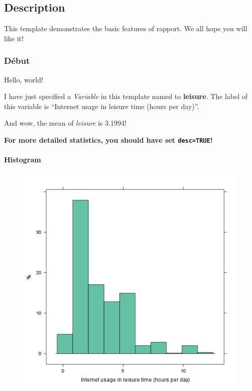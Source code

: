 \documentclass{article}
\makeatletter
\def\maxwidth{\ifdim\Gin@nat@width>\linewidth\linewidth
\else\Gin@nat@width\fi}
\let\Oldincludegraphics\includegraphics
\renewcommand{\includegraphics}[1]{\Oldincludegraphics[width=\maxwidth]{#1}}
\makeatother
\begin{document}
\subsection{Description}

This template demonstrates the basic features of rapport. We all hope
you will like it!

\subsubsection{Début}

Hello, world!

I have just specified a \emph{Variable} in this template named to
\textbf{leisure}. The label of this variable is ``Internet usage in
leisure time (hours per day)''.

And wow, the mean of \emph{leisure} is 3.1994!

\textbf{For more detailed statistics, you should have set
\texttt{desc=TRUE}!}

\paragraph{Histogram}

\begin{figure}[htbp]
\centering
\includegraphics{f72d3b7413bcb88fce740c2ab229411a.png}
\caption{}
\end{figure}
\end{document}
